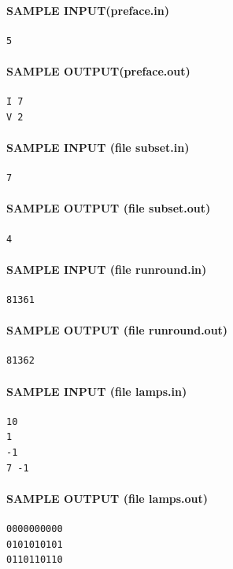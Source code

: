 \documentclass[11pt]{article}
\begin{document}
\paragraph{SAMPLE INPUT(preface.in)}
\begin{verbatim}
5
\end{verbatim}

\paragraph{SAMPLE OUTPUT(preface.out)}
\begin{verbatim}
I 7
V 2
\end{verbatim}

\paragraph{SAMPLE INPUT (file subset.in)}
\begin{verbatim}
7
\end{verbatim}

\paragraph{SAMPLE OUTPUT (file subset.out)}
\begin{verbatim}
4
\end{verbatim}

\paragraph{SAMPLE INPUT (file runround.in)}
\begin{verbatim}
81361
\end{verbatim}

\paragraph{SAMPLE OUTPUT (file runround.out)}
\begin{verbatim}
81362
\end{verbatim}

\paragraph{SAMPLE INPUT (file lamps.in)}
\begin{verbatim}
10
1
-1
7 -1
\end{verbatim}

\paragraph{SAMPLE OUTPUT (file lamps.out)}
\begin{verbatim}
0000000000
0101010101
0110110110
\end{verbatim}
\end{document}
